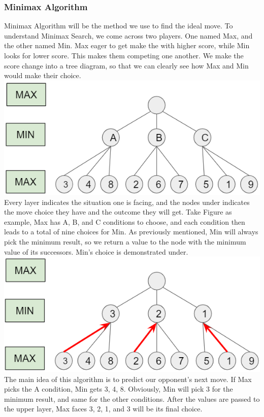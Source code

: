 \documentclass[aps,pra,preprint,amsmath,amssymb,floatfix]{revtex4-2}
\begin{document}
\subsubsection{Minimax Algorithm}
Minimax Algorithm will be the method we use to find the ideal move. To understand Minimax Search, we come across two players. One named Max, and the other named Min. Max eager to get make the with higher score, while Min looks for lower score. This makes them competing one another. We make the score change into a tree diagram, so that we can clearly see how Max and Min would make their choice.\\
\includegraphics[scale=0.6]{fig/1.png}\\
Every layer indicates the situation one is facing, and the nodes under indicates the move choice they have and the outcome they will get. Take Figure as example, Max has A, B, and C conditions to choose, and each condition then leads to a total of nine choices for Min. As previously mentioned, Min will always pick the minimum result, so we return a value to the node with the minimum value of its successors. Min’s choice is demonstrated under.\\
\includegraphics[scale=0.6]{fig/2.png}\\
The main idea of this algorithm is to predict our opponent’s next move. If Max picks the A condition, Min gets 3, 4, 8. Obviously, Min will pick 3 for the minimum result, and same for the other conditions. After the values are passed to the upper layer, Max faces 3, 2, 1, and 3 will be its final choice.\\
\end{document}
